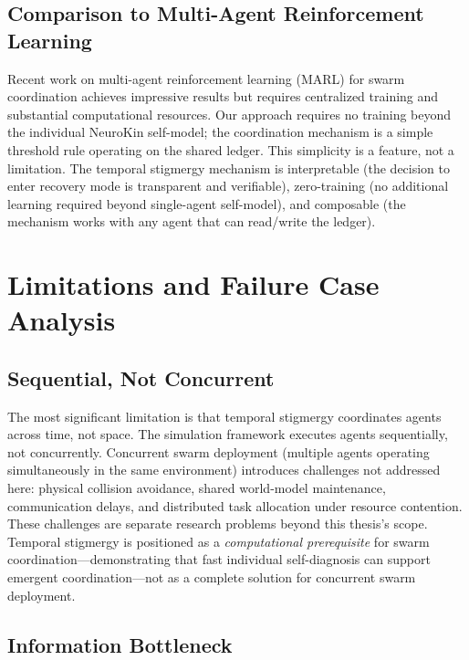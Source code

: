 \documentclass[12pt,a4paper,oneside]{report}
\begin{document}
\subsection{Comparison to Multi-Agent Reinforcement Learning}
\label{subsec:comparison_to_multi_agent_reinforcement_learning}

Recent work on multi-agent reinforcement learning (MARL) for swarm coordination \cite{domberg2026selfadapting, daneshmand2026slowrl} achieves impressive results but requires centralized training and substantial computational resources. Our approach requires no training beyond the individual NeuroKin self-model; the coordination mechanism is a simple threshold rule operating on the shared ledger. This simplicity is a feature, not a limitation. The temporal stigmergy mechanism is interpretable (the decision to enter recovery mode is transparent and verifiable), zero-training (no additional learning required beyond single-agent self-model), and composable (the mechanism works with any agent that can read/write the ledger).

\section{Limitations and Failure Case Analysis}

\subsection{Sequential, Not Concurrent}
\label{subsec:sequential_not_concurrent}

The most significant limitation is that temporal stigmergy coordinates agents across time, not space. The simulation framework executes agents sequentially, not concurrently. Concurrent swarm deployment (multiple agents operating simultaneously in the same environment) introduces challenges not addressed here: physical collision avoidance, shared world-model maintenance, communication delays, and distributed task allocation under resource contention. These challenges are separate research problems beyond this thesis's scope. Temporal stigmergy is positioned as a \textit{computational prerequisite} for swarm coordination—demonstrating that fast individual self-diagnosis can support emergent coordination—not as a complete solution for concurrent swarm deployment.

\subsection{Information Bottleneck}
\label{subsec:information_bottleneck}
\end{document}
